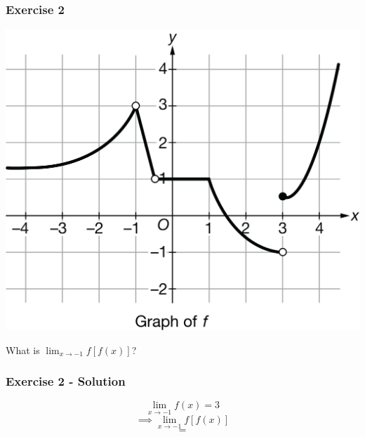 \documentclass[12pt]{beamer}
\begin{document}
\begin{frame}
	\frametitle{Exercise 2}
	\initclock
	\begin{center}
		\includegraphics[scale=0.5]{graph0913.png}
	\end{center}
	\large
	\begin{center}
		What is $\displaystyle\lim_{x\to-1}f[f(x)]$?\\
	\end{center}
	\crono
\end{frame}
\begin{frame}
	\frametitle{Exercise 2 - Solution}

	\[\displaystyle\lim_{x\to-1}f(x) = 3\]
	\[\implies\displaystyle\lim_{x\to-1}f[f(x)]\]
	\[=\]
\end{frame}
\end{document}
